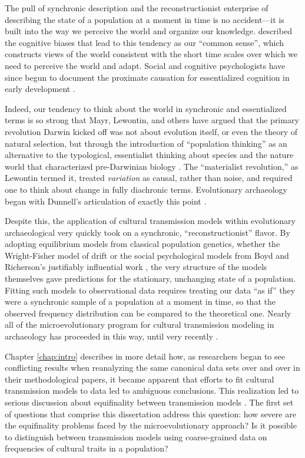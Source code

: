 The pull of synchronic description and the reconstructionist enterprise of describing the state of a population at a moment in time is no accident---it is built into the way we perceive the world and organize our knowledge.   \citet{Dunnell1982} described the cognitive biases that lead to this tendency as our ``common sense'', which constructs views of the world consistent with the short time scales over which we need to perceive the world and adapt.  Social and cognitive psychologists have since begun to document the proximate causation for essentialized cognition in early development .  

Indeed, our tendency to think about the world in synchronic and essentialized terms is so strong that Mayr, Lewontin, and others have argued that the primary revolution Darwin kicked off was not about evolution itself, or even the theory of natural selection, but through the introduction of ``population thinking'' as an alternative to the typological, essentialist thinking about species and the nature world that characterized pre-Darwinian biology \citep{Dunnell1982,lewontin1974darwin,Mayr1959typological}.  The ``materialist revolution,'' as Lewontin termed it, treated \emph{variation} as causal, rather than noise, and required one to think about change in fully diachronic terms.  Evolutionary archaeology began with Dunnell's articulation of exactly this point \citep{Dunnell1978,Dunnell1980,Dunnell1982,Dunnell1989}.  

Despite this, the application of cultural transmission models within evolutionary archaeological very quickly took on a synchronic, ``reconstructionist'' flavor.  By adopting equilibrium models from classical population genetics, whether the Wright-Fisher model of drift or the social psychological models from Boyd and Richerson's justifiably influential work \citeyearpar{BR1985}, the very structure of the models themselves gave predictions for the stationary, unchanging state of a population.  Fitting such models to observational data requires treating our data ``as if'' they were a synchronic sample of a population at a moment in time, so that the observed frequency distribution can be compared to the theoretical one.  Nearly all of the microevolutionary program for cultural  transmission modeling in archaeology has proceeded in this way, until very recently \citep{Kandler2013}. 

Chapter \ref{chap:intro} describes in more detail how, as researchers began to see conflicting results when reanalyzing the same canonical data sets over and over in their methodological papers, it became apparent that efforts to fit cultural transmission models to data led to ambiguous conclusions.  This realization led to serious discussion about equifinality between transmission models \citep{barrett2019equifinality,kandler2019analysing,premo2010equifinality}.  The first set of questions that comprise this dissertation address this question:  how severe are  the equifinality problems faced by the microevolutionary approach?  Is it possible to distinguish between transmission models using coarse-grained data on frequencies of cultural traits in a population?

